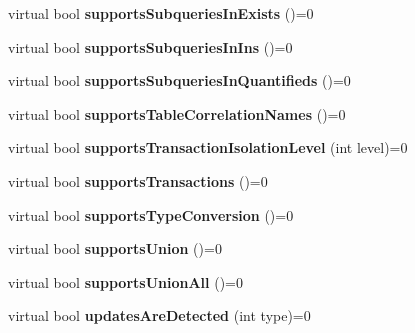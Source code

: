 \begin{DoxyCompactItemize}
virtual bool {\bfseries supports\+Subqueries\+In\+Exists} ()=0
\item 
\hypertarget{classsql_1_1_database_meta_data_adcc66e2724e3719a25b7f21a9e53273f}{}\label{classsql_1_1_database_meta_data_adcc66e2724e3719a25b7f21a9e53273f} 
virtual bool {\bfseries supports\+Subqueries\+In\+Ins} ()=0
\item 
\hypertarget{classsql_1_1_database_meta_data_a761c62ade45b12afcce9f28f0cd1eeed}{}\label{classsql_1_1_database_meta_data_a761c62ade45b12afcce9f28f0cd1eeed} 
virtual bool {\bfseries supports\+Subqueries\+In\+Quantifieds} ()=0
\item 
\hypertarget{classsql_1_1_database_meta_data_ad3d6af280682dc7652c9920f0714cf97}{}\label{classsql_1_1_database_meta_data_ad3d6af280682dc7652c9920f0714cf97} 
virtual bool {\bfseries supports\+Table\+Correlation\+Names} ()=0
\item 
\hypertarget{classsql_1_1_database_meta_data_a49e4c63665f58a537238b1f02dd7b0e0}{}\label{classsql_1_1_database_meta_data_a49e4c63665f58a537238b1f02dd7b0e0} 
virtual bool {\bfseries supports\+Transaction\+Isolation\+Level} (int level)=0
\item 
\hypertarget{classsql_1_1_database_meta_data_ae79ec1a681e19b8c0765a759783f4c67}{}\label{classsql_1_1_database_meta_data_ae79ec1a681e19b8c0765a759783f4c67} 
virtual bool {\bfseries supports\+Transactions} ()=0
\item 
\hypertarget{classsql_1_1_database_meta_data_ac26276d6d239a331403d53250157879e}{}\label{classsql_1_1_database_meta_data_ac26276d6d239a331403d53250157879e} 
virtual bool {\bfseries supports\+Type\+Conversion} ()=0
\item 
\hypertarget{classsql_1_1_database_meta_data_a1f43c1150ca7d0589d6ef0de988001bb}{}\label{classsql_1_1_database_meta_data_a1f43c1150ca7d0589d6ef0de988001bb} 
virtual bool {\bfseries supports\+Union} ()=0
\item 
\hypertarget{classsql_1_1_database_meta_data_aa924352f06cb349eb7b6b7a33feef233}{}\label{classsql_1_1_database_meta_data_aa924352f06cb349eb7b6b7a33feef233} 
virtual bool {\bfseries supports\+Union\+All} ()=0
\item 
\hypertarget{classsql_1_1_database_meta_data_a0d2f2067302df8b875f24876d4fb5f5f}{}\label{classsql_1_1_database_meta_data_a0d2f2067302df8b875f24876d4fb5f5f} 
virtual bool {\bfseries updates\+Are\+Detected} (int type)=0
\item 
\hypertarget{classsql_1_1_database_meta_data_abc7af647167483362444effa2ca35ad7}{}\label{classsql_1_1_database_meta_data_abc7af647167483362444effa2ca35ad7} 

\end{DoxyCompactItemize}
